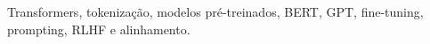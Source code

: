 
Transformers, tokenização, modelos pré-treinados, BERT, GPT, fine-tuning, prompting, RLHF e alinhamento.

